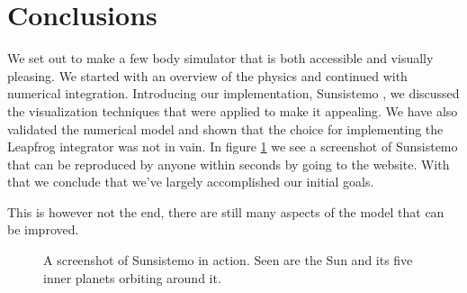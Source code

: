 \documentclass[a4paper]{article}
\begin{document}
\section{Conclusions}
We set out to make a few body simulator that is both accessible and visually pleasing. We started
with an overview of the physics and continued with numerical integration. Introducing our
implementation, Sunsistemo \cite{sunsistemo}, we discussed the visualization techniques that were
applied to make it appealing. We have also validated the numerical model and shown that the choice
for implementing the Leapfrog integrator was not in vain. In figure \ref{fig:sunsistemoPrtSc} we see
a screenshot of Sunsistemo that can be reproduced by anyone within seconds by going to the website.
With that we conclude that we've largely accomplished our initial goals.

This is however not the end, there are still many aspects of the model that can be improved.

\begin{figure}
\caption{A screenshot of Sunsistemo in action. Seen are the Sun and its five inner planets orbiting
  around it.}
\label{fig:sunsistemoPrtSc}
\end{figure}
\end{document}
